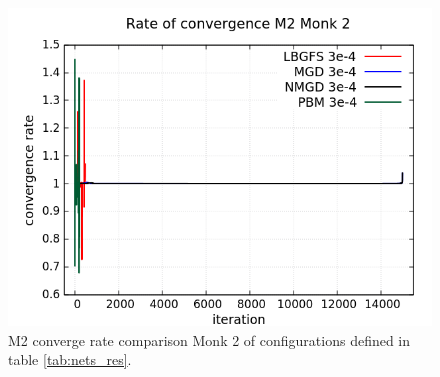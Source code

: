 \begin{figure}[H]
	\centering
	\includegraphics[width=0.6\linewidth]{data/Comparison/Monk2/Monk2_M2_CR_standard.png}
	\caption{M2 converge rate comparison Monk 2 of configurations defined in table \ref{tab:nets_res}.}
	\label{fig:CR-M2-Monk2-Standard}
\end{figure}


